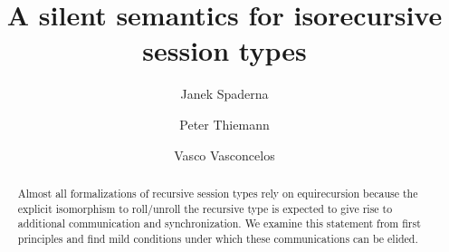 \documentclass[adraft]{eptcs}
\title{A silent semantics for isorecursive session types}
\author{Janek Spaderna \and Peter Thiemann \and Vasco Vasconcelos}
\begin{document}
\maketitle
\begin{abstract}
  Almost all formalizations of recursive session types rely on
  equirecursion because the explicit isomorphism to roll/unroll the
  recursive type is expected to give rise to additional communication and
  synchronization. We examine this statement from first principles and
  find mild conditions under which these communications can be
  elided.
\end{abstract}










\clearpage
\appendix



\end{document}
